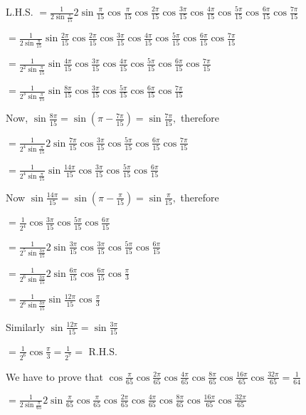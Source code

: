   L.H.S. $=
  \frac{1}{2\sin\frac{\pi}{15}}2\sin\frac{\pi}{15}\cos\frac{\pi}{15}\cos\frac{2\pi}{15}\cos\frac{3\pi}{15}\cos\frac{4\pi}{15}\cos\frac{5\pi}{15}\cos\frac{6\pi}{15}\cos\frac{7\pi}{15}$

  $=
  \frac{1}{2\sin\frac{\pi}{15}}\sin\frac{2\pi}{15}\cos\frac{2\pi}{15}\cos\frac{3\pi}{15}\cos\frac{4\pi}{15}\cos\frac{5\pi}{15}\cos\frac{6\pi}{15}\cos\frac{7\pi}{15}$

  $= \frac{1}{2^2\sin\frac{\pi}{15}}\sin\frac{4\pi}{15}\cos\frac{3\pi}{15}\cos\frac{4\pi}{15}\cos\frac{5\pi}{15}\cos\frac{6\pi}{15}\cos\frac{7\pi}{15}$

  $=
  \frac{1}{2^3\sin\frac{\pi}{15}}\sin\frac{8\pi}{15}\cos\frac{3\pi}{15}\cos\frac{5\pi}{15}\cos\frac{6\pi}{15}\cos\frac{7\pi}{15}$

  Now, $\sin\frac{8\pi}{15} = \sin\left(\pi - \frac{7\pi}{15}\right) = \sin\frac{7\pi}{15},$ therefore

  $=
  \frac{1}{2^4\sin\frac{\pi}{15}}2\sin\frac{7\pi}{15}\cos\frac{3\pi}{15}\cos\frac{5\pi}{15}\cos\frac{6\pi}{15}\cos\frac{7\pi}{15}$

  $= \frac{1}{2^4\sin\frac{\pi}{15}}\sin\frac{14\pi}{15}\cos\frac{3\pi}{15}\cos\frac{5\pi}{15}\cos\frac{6\pi}{15}$

  Now $\sin\frac{14\pi}{15} = \sin\left(\pi - \frac{\pi}{15}\right) = \sin\frac{\pi}{15},$ therefore

  $= \frac{1}{2^4}\cos\frac{3\pi}{15}\cos\frac{5\pi}{15}\cos\frac{6\pi}{15}$

  $= \frac{1}{2^5\sin\frac{3\pi}{15}}2\sin\frac{3\pi}{15}\cos\frac{3\pi}{15}\cos\frac{5\pi}{15}\cos\frac{6\pi}{15}$

  $= \frac{1}{2^6\sin\frac{3\pi}{15}}2\sin\frac{6\pi}{15}\cos\frac{6\pi}{15}\cos\frac{\pi}{3}$

  $= \frac{1}{2^6\sin\frac{3\pi}{15}}\sin\frac{12\pi}{15}\cos\frac{\pi}{3}$

  Similarly $\sin\frac{12\pi}{15} = \sin \frac{3\pi}{15}$

  $= \frac{1}{2^6}\cos\frac{\pi}{3} = \frac{1}{2^7} =$ R.H.S.

\item We have to prove that
  $\cos\frac{\pi}{65}\cos\frac{2\pi}{65}\cos\frac{4\pi}{65}\cos\frac{8\pi}{65}\cos\frac{16\pi}{65}\cos\frac{32\pi}{65} =
  \frac{1}{64}$

  $=
  \frac{1}{2\sin\frac{\pi}{65}}2\sin\frac{\pi}{65}\cos\frac{\pi}{65}\cos\frac{2\pi}{65}\cos\frac{4\pi}{65}\cos\frac{8\pi}{65}\cos\frac{16\pi}{65}\cos\frac{32\pi}{65}$

